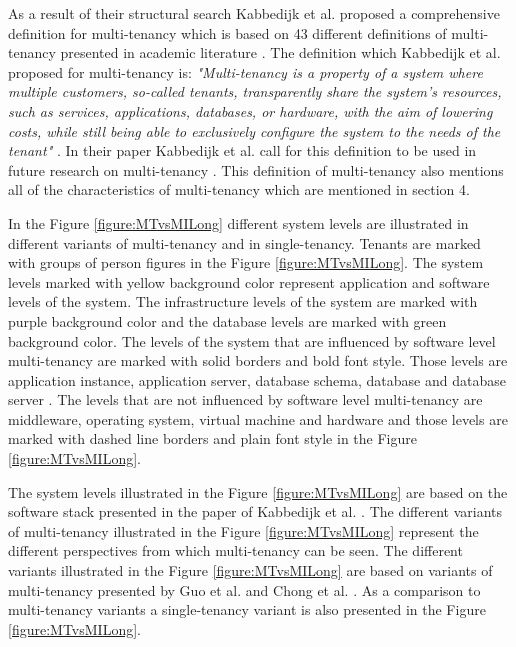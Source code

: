 \documentclass[conference]{sasmoota2017}
\begin{document}
As a result of their structural search Kabbedijk et al. proposed a comprehensive definition for multi-tenancy which is based on 43 different definitions of multi-tenancy presented in academic literature \cite{Kabbedijk2015:Defining}. The definition which Kabbedijk et al. proposed for multi-tenancy is: \textit{"Multi-tenancy is a property of a system where multiple customers, so-called tenants, transparently share the system's resources, such as services, applications, databases, or hardware, with the aim of lowering costs, while still being able to exclusively configure the system to the needs of the tenant"} \cite{Kabbedijk2015:Defining}. In their paper Kabbedijk et al. call for this definition to be used in future research on multi-tenancy \cite{Kabbedijk2015:Defining}. This definition of multi-tenancy also mentions all of the characteristics of multi-tenancy which are mentioned in section 4. 

In the Figure \ref{figure:MTvsMILong} different system levels are illustrated in different variants of multi-tenancy and in single-tenancy. Tenants are marked with groups of person figures in the Figure \ref{figure:MTvsMILong}. The system levels marked with yellow background color represent application and software levels of the system. The infrastructure levels of the system are marked with purple background color and the database levels are marked with green background color. The levels of the system that are influenced by software level multi-tenancy are marked with solid borders and bold font style. Those levels are application instance, application server, database schema, database and database server \cite{Kabbedijk2015:Defining}. The levels that are not influenced by software level multi-tenancy are middleware, operating system, virtual machine and hardware and those levels are marked with dashed line borders and plain font style in the Figure \ref{figure:MTvsMILong}. 

The system levels illustrated in the Figure \ref{figure:MTvsMILong} are based on the software stack presented in the paper of Kabbedijk et al. \cite{Kabbedijk2015:Defining}. The different variants of multi-tenancy illustrated in the Figure \ref{figure:MTvsMILong} represent the different perspectives from which multi-tenancy can be seen. The different variants illustrated in the Figure \ref{figure:MTvsMILong} are based on variants of multi-tenancy presented by Guo et al. \cite{Guo:2007:FrameworkForNative} and Chong et al. \cite{Chong:2006:MultiTenantDataArchitecture}. As a comparison to multi-tenancy variants a single-tenancy variant is also presented in the Figure \ref{figure:MTvsMILong}. 
\end{document}
